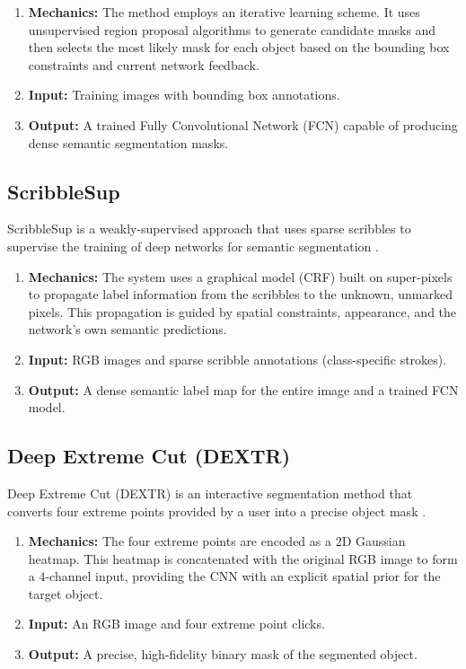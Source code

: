 \begin{enumerate}
	\item \textbf{Mechanics:} The method employs an iterative learning scheme. It uses unsupervised region proposal algorithms to generate candidate masks and then selects the most likely mask for each object based on the bounding box constraints and current network feedback.

	\item \textbf{Input:} Training images with bounding box annotations.
	
	\item \textbf{Output:} A trained Fully Convolutional Network (FCN) capable of producing dense semantic segmentation masks.
\end{enumerate}

\subsection{ScribbleSup}
ScribbleSup is a weakly-supervised approach that uses sparse scribbles to supervise the training of deep networks for semantic segmentation \cite{scribble_sup_2016}.

\begin{enumerate}
	\item \textbf{Mechanics:} The system uses a graphical model (CRF) built on super-pixels to propagate label information from the scribbles to the unknown, unmarked pixels. This propagation is guided by spatial constraints, appearance, and the network’s own semantic predictions.
	
	\item \textbf{Input:} RGB images and sparse scribble annotations (class-specific strokes).
	
	\item \textbf{Output:} A dense semantic label map for the entire image and a trained FCN model.
\end{enumerate}

\subsection{Deep Extreme Cut (DEXTR)}
Deep Extreme Cut (DEXTR) is an interactive segmentation method that converts four extreme points provided by a user into a precise object mask \cite{deep_extreme_cut_2018}.

\begin{enumerate}
	\item \textbf{Mechanics:} The four extreme points are encoded as a 2D Gaussian heatmap. This heatmap is concatenated with the original RGB image to form a 4-channel input, providing the CNN with an explicit spatial prior for the target object.
	
	\item \textbf{Input:} An RGB image and four extreme point clicks.
	
	\item \textbf{Output:} A precise, high-fidelity binary mask of the segmented object.
\end{enumerate}

